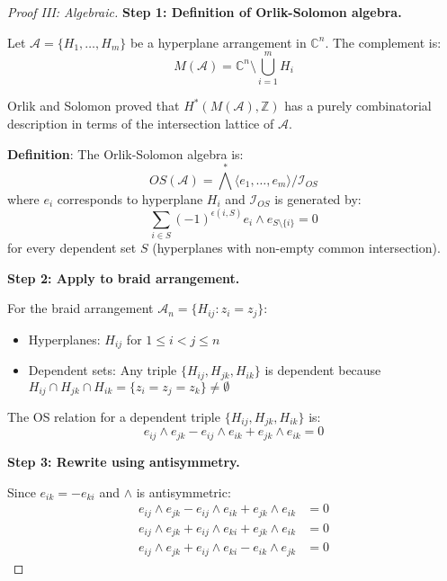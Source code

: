 \begin{proof}[Proof III: Algebraic]

\textbf{Step 1: Definition of Orlik-Solomon algebra.}

Let $\mathcal{A} = \{H_1, \ldots, H_m\}$ be a hyperplane arrangement in $\mathbb{C}^n$. 
The complement is:
\begin{equation}
M(\mathcal{A}) = \mathbb{C}^n \setminus \bigcup_{i=1}^m H_i
\end{equation}

Orlik and Solomon \cite{OrlikSolomon80} proved that $H^*(M(\mathcal{A}), \mathbb{Z})$ 
has a purely combinatorial description in terms of the intersection lattice of $\mathcal{A}$.

\textbf{Definition}: The Orlik-Solomon algebra is:
\begin{equation}
OS(\mathcal{A}) = \bigwedge^* \langle e_1, \ldots, e_m \rangle / \mathcal{I}_{OS}
\end{equation}
where $e_i$ corresponds to hyperplane $H_i$ and $\mathcal{I}_{OS}$ is generated by:
\begin{equation}
\sum_{i \in S} (-1)^{\epsilon(i,S)} e_i \wedge e_{S \setminus \{i\}} = 0
\end{equation}
for every dependent set $S$ (hyperplanes with non-empty common intersection).

\textbf{Step 2: Apply to braid arrangement.}

For the braid arrangement $\mathcal{A}_n = \{H_{ij} : z_i = z_j\}$:
\begin{itemize}
\item Hyperplanes: $H_{ij}$ for $1 \leq i < j \leq n$
\item Dependent sets: Any triple $\{H_{ij}, H_{jk}, H_{ik}\}$ is dependent because 
$H_{ij} \cap H_{jk} \cap H_{ik} = \{z_i = z_j = z_k\} \neq \emptyset$
\end{itemize}

The OS relation for a dependent triple $\{H_{ij}, H_{jk}, H_{ik}\}$ is:
\begin{equation}
e_{ij} \wedge e_{jk} - e_{ij} \wedge e_{ik} + e_{jk} \wedge e_{ik} = 0
\end{equation}

\textbf{Step 3: Rewrite using antisymmetry.}

Since $e_{ik} = -e_{ki}$ and $\wedge$ is antisymmetric:
\begin{align}
e_{ij} \wedge e_{jk} - e_{ij} \wedge e_{ik} + e_{jk} \wedge e_{ik} &= 0\\
e_{ij} \wedge e_{jk} + e_{ij} \wedge e_{ki} + e_{jk} \wedge e_{ik} &= 0\\
e_{ij} \wedge e_{jk} + e_{ij} \wedge e_{ki} - e_{ik} \wedge e_{jk} &= 0
\end{align}


\end{proof}

